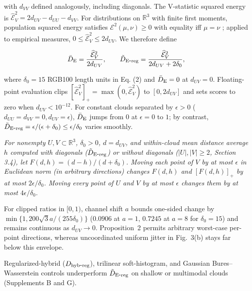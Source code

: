 \noindent with $d_{VV}$ defined analogously, including diagonals. The V-statistic squared energy is $\widehat{\mathcal E}_V^2=2d_{UV}-d_{UU}-d_{VV}$. For distributions on $\mathbb R^3$ with finite first moments, population squared energy satisfies $\mathcal E^2(\mu,\nu)\ge 0$ with equality iff $\mu=\nu$ \cite{ref27,ref28}; applied to empirical measures, $0\le\widehat{\mathcal E}_V^2\le 2d_{UV}$. We therefore define


\begin{equation}
\bar D_{\mathrm E}{}=\frac{\widehat{\mathcal E}_V^2}{2d_{UV}},\qquad\tilde D_{\mathrm{E\mbox{-}reg}}{}=\frac{\widehat{\mathcal E}_V^2}{2d_{UV}+2\delta_0},
\end{equation}

\noindent where $\delta_0=15$ RGB100 length units in Eq. (2) and $\bar D_{\mathrm E}{}=0$ at $d_{UV}=0$. Floating-point evaluation clips $[\widehat{\mathcal E}_V^2]_+=\max(0,\widehat{\mathcal E}_V^2)$ to $[0,2d_{UV}]$ and sets scores to zero when $d_{UV}<10^{-12}$. For constant clouds separated by $\epsilon>0$ ($d_{UU}=d_{VV}=0, d_{UV}=\epsilon$), $\bar D_{\mathrm E}{}$ jumps from $0$ at $\epsilon=0$ to $1$; by contrast, $\tilde D_{\mathrm{E\mbox{-}reg}}{}=\epsilon/(\epsilon+\delta_0)\le\epsilon/\delta_0$ varies smoothly.


\begin{proposition}\label{prop:2}\normalfont \emph{For nonempty $U,V\subset\mathbb R^3$, $\delta_0>0$, $d=d_{UV}$, and within-cloud mean distance average $h$ computed with diagonals ($\tilde D_{\mathrm{E\mbox{-}reg}}{}$) or without diagonals ($|U|,|V|\ge 2$, Section 3.4), let $F(d,h)=(d-h)/(d+\delta_0)$. Moving each point of $V$ by at most $\epsilon$ in Euclidean norm (in arbitrary directions) changes $F(d,h)$ and $[F(d,h)]_+$ by at most $2\epsilon/\delta_0$. Moving every point of $U$ and $V$ by at most $\epsilon$ changes them by at most $4\epsilon/\delta_0$.}


\end{proposition}

For clipped ratios in $[0,1)$, channel shift $a$ bounds one-sided change by $\min\{1, 200\sqrt{3}a/(255\delta_0)\}$ ($0.0906$ at $a=1$, $0.7245$ at $a=8$ for $\delta_0=15$) and remains continuous as $d_{UV}\to 0$. Proposition~2 permits arbitrary worst-case per-point directions, whereas uncoordinated uniform jitter in Fig.~3(b) stays far below this envelope.

Regularized-hybrid ($D_{\mathrm{hyb\mbox{-}reg}}{}$), trilinear soft-histogram, and Gaussian Bures--Wasserstein \cite{ref29} controls underperform $\tilde D_{\mathrm{E\mbox{-}reg}}{}$ on shallow or multimodal clouds (Supplements B and G).


